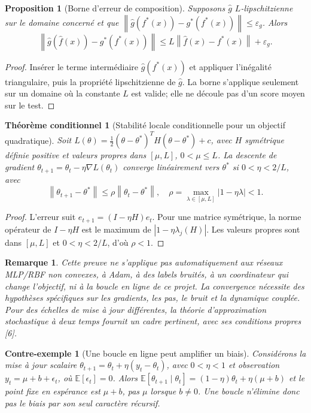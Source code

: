\documentclass[11pt,a4paper]{article}
\newtheorem{proposition}[definition]{Proposition}
\newtheorem{theorem}[definition]{Théorème conditionnel}
\newtheorem{remark}[definition]{Remarque}
\newtheorem{counterexample}[definition]{Contre-exemple}
\newcommand{\norm}[1]{\left\lVert#1\right\rVert}
\begin{document}
\begin{proposition}[Borne d'erreur de composition]
Supposons $\hat g$ $L$-lipschitzienne sur le domaine concerné et que $\norm{\hat g(f^*(x))-g^*(f^*(x))}\leq\varepsilon_g$. Alors
\[
\norm{\hat g(\hat f(x))-g^*(f^*(x))}\leq L\norm{\hat f(x)-f^*(x)}+\varepsilon_g.
\]
\end{proposition}
\begin{proof}
Insérer le terme intermédiaire $\hat g(f^*(x))$ et appliquer l'inégalité triangulaire, puis la propriété lipschitzienne de $\hat g$. La borne s'applique seulement sur un domaine où la constante $L$ est valide; elle ne découle pas d'un score moyen sur le test.
\end{proof}

\begin{theorem}[Stabilité locale conditionnelle pour un objectif quadratique]
Soit $L(\theta)=\tfrac12(\theta-\theta^*)^T H(\theta-\theta^*)+c$, avec $H$ symétrique définie positive et valeurs propres dans $[\mu,L]$, $0<\mu\leq L$. La descente de gradient $\theta_{t+1}=\theta_t-\eta\nabla L(\theta_t)$ converge linéairement vers $\theta^*$ si $0<\eta<2/L$, avec
\[
\norm{\theta_{t+1}-\theta^*}\leq\rho\norm{\theta_t-\theta^*},\quad
\rho=\max_{\lambda\in[\mu,L]}|1-\eta\lambda|<1.
\]
\end{theorem}
\begin{proof}
L'erreur suit $e_{t+1}=(I-\eta H)e_t$. Pour une matrice symétrique, la norme opérateur de $I-\eta H$ est le maximum de $|1-\eta\lambda_j(H)|$. Les valeurs propres sont dans $[\mu,L]$ et $0<\eta<2/L$, d'où $\rho<1$.\end{proof}
\begin{remark}
Cette preuve ne s'applique pas automatiquement aux réseaux MLP/RBF non convexes, à Adam, à des labels bruités, à un coordinateur qui change l'objectif, ni à la boucle en ligne de ce projet. La convergence nécessite des hypothèses spécifiques sur les gradients, les pas, le bruit et la dynamique couplée. Pour des échelles de mise à jour différentes, la théorie d'approximation stochastique à deux temps fournit un cadre pertinent, avec ses conditions propres [6].
\end{remark}

\begin{counterexample}[Une boucle en ligne peut amplifier un biais]
Considérons la mise à jour scalaire $\theta_{t+1}=\theta_t+\eta(y_t-\theta_t)$, avec $0<\eta<1$ et observation $y_t=\mu+b+\epsilon_t$, où $\mathbb E[\epsilon_t]=0$. Alors $\mathbb E[\theta_{t+1}\mid\theta_t]=(1-\eta)\theta_t+\eta(\mu+b)$ et le point fixe en espérance est $\mu+b$, pas $\mu$ lorsque $b\ne0$. Une boucle n'élimine donc pas le biais par son seul caractère récursif.
\end{counterexample}
\end{document}
